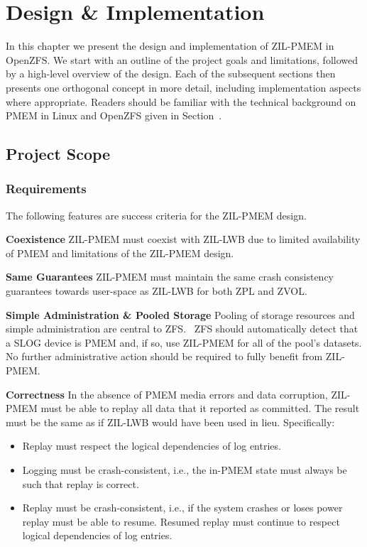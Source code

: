 \documentclass[12pt,a4paper,twoside]{book}
\begin{document}
\chapter{Design \& Implementation}
In this chapter we present the design and implementation of ZIL-PMEM in OpenZFS.
We start with an outline of the project goals and limitations, followed by a high-level overview of the design.
Each of the subsequent sections then presents one orthogonal concept in more detail, including implementation aspects where appropriate.
Readers should be familiar with the technical background on PMEM in Linux and OpenZFS given in Section~.

\section{Project Scope}

\newcommand{\csgoal}[1]{\textbf{#1}}

\subsection{Requirements}\label{sec:requirements}
The following features are success criteria for the ZIL-PMEM design.

\csgoal{Coexistence}
ZIL-PMEM must coexist with ZIL-LWB due to limited availability of PMEM and limitations of the ZIL-PMEM design.

\csgoal{Same Guarantees}
ZIL-PMEM must maintain the same crash consistency guarantees towards user-space as ZIL-LWB for both ZPL and ZVOL.

\csgoal{Simple Administration \& Pooled Storage}
Pooling of storage resources and simple administration are central to ZFS.~\cite{bonwickZettabyteFileSystem2003}
ZFS should automatically detect that a SLOG device is PMEM and, if so, use ZIL-PMEM for all of the pool’s datasets.
No further administrative action should be required to fully benefit from ZIL-PMEM.

\csgoal{Correctness}
In the absence of PMEM media errors and data corruption, ZIL-PMEM must be able to replay all data that it reported as committed.
The result must be the same as if ZIL-LWB would have been used in lieu.
Specifically:
\begin{itemize}[noitemsep,beginpenalty=100000,midpenalty=100000]
    \item Replay must respect the logical dependencies of log entries.
    \item Logging must be crash-consistent, i.e., the in-PMEM state must always be such that replay is correct.
    \item Replay must be crash-consistent, i.e., if the system crashes or loses power replay must be able to resume. Resumed replay must continue to respect logical dependencies of log entries.
\end{itemize}
\end{document}
